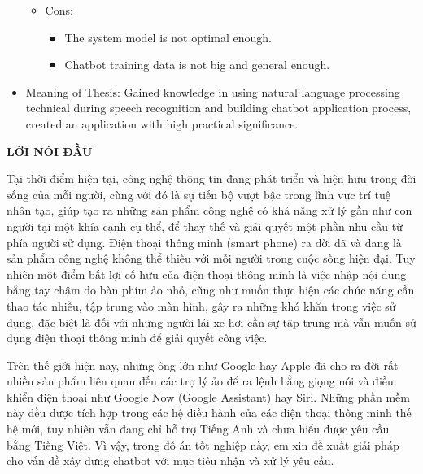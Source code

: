 \documentclass[12pt]{report}
\begin{document}
\begin{itemize}
\begin{itemize}
\begin{itemize}
		\end{itemize}
		\item Cons:
		\begin{itemize}
			\item The system model is not optimal enough.
			\item Chatbot training data is not big and general enough.
		\end{itemize}
	\end{itemize}
	\item Meaning of Thesis: Gained knowledge in using natural language processing technical during speech recognition and building chatbot application process, created an application with high practical significance.
\end{itemize}

\newpage
\tableofcontents

\newpage
\listoffigures
{}

\newpage
\listoftables
{}

\newpage
\lstlistoflistings
{}


\newpage
\begin{center}
{\large \textbf{LỜI NÓI ĐẦU}}
\end{center}
Tại thời điểm hiện tại, công nghệ thông tin đang phát triển và hiện hữu trong đời sống của mỗi người, cùng với đó là sự tiến bộ vượt bậc trong lĩnh vực trí tuệ nhân tạo, giúp tạo ra những sản phẩm công nghệ có khả năng xử lý gần như con người tại một khía cạnh cụ thể, để thay thế và giải quyết một phần nhu cầu từ phía người sử dụng. Điện thoại thông minh (smart phone) ra đời đã và đang là sản phẩm công nghệ không thể thiếu với mỗi người trong cuộc sống hiện đại. Tuy nhiên một điểm bất lợi cố hữu của điện thoại thông minh là việc nhập nội dung bằng tay chậm do bàn phím ảo nhỏ, cũng như muốn thực hiện các chức năng cần thao tác nhiều, tập trung vào màn hình, gây ra những khó khăn trong việc sử dụng, đặc biệt là đối với những người lái xe hơi cần sự tập trung mà vẫn muốn sử dụng điện thoại thông minh để giải quyết công việc.

Trên thế giới hiện nay, những ông lớn như Google hay Apple đã cho ra đời rất nhiều sản phẩm liên quan đến các trợ lý ảo để ra lệnh bằng giọng nói và điều khiển điện thoại như Google Now (Google Assistant) hay Siri. Những phần mềm này đều được tích hợp trong các hệ điều hành của các điện thoại thông minh thế hệ mới, tuy nhiên vẫn đang chỉ hỗ trợ Tiếng Anh và chưa hiểu được yêu cầu bằng Tiếng Việt. Vì vậy, trong đồ án tốt nghiệp này, em xin đề xuất giải pháp cho vấn đề xây dựng chatbot với mục tiêu nhận và xử lý yêu cầu.
\end{document}
